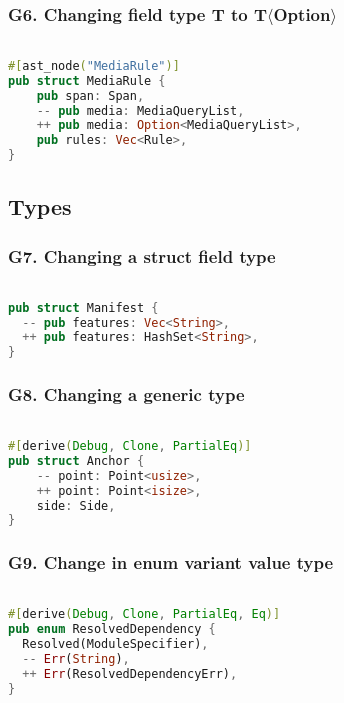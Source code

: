 \documentclass{article}
\begin{document}
\subsubsection{G6. Changing field type T to T$\langle$Option$\rangle$}

\begin{lstlisting}[language=Rust, style=colouredRust, label={l3}]

#[ast_node("MediaRule")]
pub struct MediaRule {
    pub span: Span,
    -- pub media: MediaQueryList,
    ++ pub media: Option<MediaQueryList>,
    pub rules: Vec<Rule>,
}

\end{lstlisting}

\subsection{Types}
\subsubsection{G7. Changing a struct field type}

\begin{lstlisting}[language=Rust, style=colouredRust, label={l3}]

pub struct Manifest {
  -- pub features: Vec<String>,
  ++ pub features: HashSet<String>,
}

\end{lstlisting}

\subsubsection{G8. Changing a generic type}

\begin{lstlisting}[language=Rust, style=colouredRust, label={l3}]

#[derive(Debug, Clone, PartialEq)]
pub struct Anchor {
    -- point: Point<usize>,
    ++ point: Point<isize>,
    side: Side,
}

\end{lstlisting}

\subsubsection{G9. Change in enum variant value type}

\begin{lstlisting}[language=Rust, style=colouredRust, label={l3}]

#[derive(Debug, Clone, PartialEq, Eq)]
pub enum ResolvedDependency {
  Resolved(ModuleSpecifier),
  -- Err(String),
  ++ Err(ResolvedDependencyErr),
}

\end{lstlisting}
\end{document}
